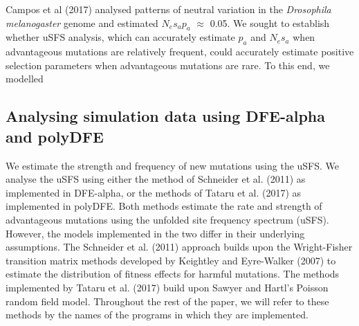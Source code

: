 \documentclass[11pt]{article}
\begin{document}
	Campos et al (2017) analysed patterns of neutral variation in the \textit{Drosophila melanogaster} genome and estimated $N_es_ap_a$ $\approx$ 0.05. We sought to establish whether uSFS analysis, which can accurately estimate $p_a$ and $N_es_a$ when advantageous mutations are relatively frequent, could accurately estimate positive selection parameters when advantageous mutations are rare. To this end, we modelled 

%
%

	\subsection*{Analysing simulation data using DFE-alpha and polyDFE}

	We estimate the strength and frequency of new mutations using the uSFS. We analyse the uSFS using either the method of Schneider et al. (2011) as implemented in DFE-alpha, or the methods of Tataru et al. (2017) as implemented in polyDFE. Both methods estimate the rate and strength of advantageous mutations using the unfolded site frequency spectrum (uSFS). However, the models implemented in the two differ in their underlying assumptions. The Schneider et al. (2011) approach builds upon the Wright-Fisher transition matrix methods developed by Keightley and Eyre-Walker (2007) to estimate the distribution of fitness effects for harmful mutations. The methods implemented by Tataru et al. (2017) build upon Sawyer and Hartl’s Poisson random field model.
Throughout the rest of the paper, we will refer to these methods by the names of the programs in which they are implemented.
\end{document}
